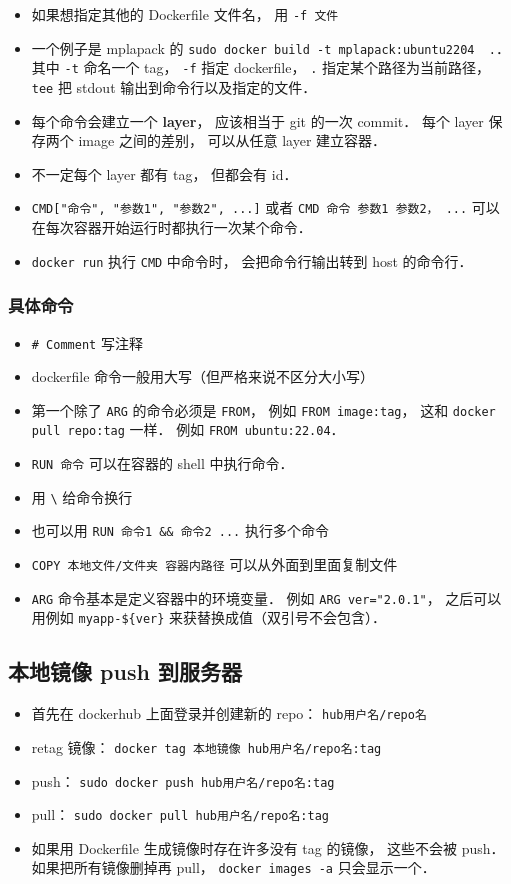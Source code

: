 \begin{itemize}
\item 如果想指定其他的 Dockerfile 文件名， 用 \verb|-f 文件|
\item 一个例子是 mplapack 的 \verb|sudo docker build -t mplapack:ubuntu2204  .|． 其中 \verb|-t| 命名一个 tag， \verb|-f| 指定 dockerfile， \verb|.| 指定某个路径为当前路径， \verb|tee| 把 stdout 输出到命令行以及指定的文件．
\item 每个命令会建立一个 \textbf{layer}， 应该相当于 git 的一次 commit． 每个 layer 保存两个 image 之间的差别， 可以从任意 layer 建立容器．
\item 不一定每个 layer 都有 tag， 但都会有 id．
\item \verb|CMD["命令", "参数1", "参数2", ...]| 或者 \verb|CMD 命令 参数1 参数2， ...| 可以在每次容器开始运行时都执行一次某个命令．
\item \verb|docker run| 执行 \verb|CMD| 中命令时， 会把命令行输出转到 host 的命令行．
\end{itemize}

\subsubsection{具体命令}
\begin{itemize}
\item \verb|# Comment| 写注释
\item dockerfile 命令一般用大写（但严格来说不区分大小写）
\item 第一个除了 \verb|ARG| 的命令必须是 \verb|FROM|， 例如 \verb|FROM image:tag|， 这和 \verb|docker pull repo:tag| 一样． 例如 \verb|FROM ubuntu:22.04|．
\item \verb|RUN 命令| 可以在容器的 shell 中执行命令．
\item 用 \verb|\| 给命令换行
\item 也可以用 \verb|RUN 命令1 && 命令2 ...| 执行多个命令
\item \verb|COPY 本地文件/文件夹 容器内路径| 可以从外面到里面复制文件
\item \verb|ARG| 命令基本是定义容器中的环境变量． 例如 \verb|ARG ver="2.0.1"|， 之后可以用例如 \verb|myapp-${ver}| 来获替换成值（双引号不会包含）．
\end{itemize}

\subsection{本地镜像 push 到服务器}
\begin{itemize}
\item 首先在 dockerhub 上面登录并创建新的 repo： \verb|hub用户名/repo名|
\item retag 镜像： \verb|docker tag 本地镜像 hub用户名/repo名:tag|
\item push： \verb|sudo docker push hub用户名/repo名:tag|
\item pull： \verb|sudo docker pull hub用户名/repo名:tag|
\item 如果用 Dockerfile 生成镜像时存在许多没有 tag 的镜像， 这些不会被 push． 如果把所有镜像删掉再 pull， \verb|docker images -a| 只会显示一个．
\end{itemize}

